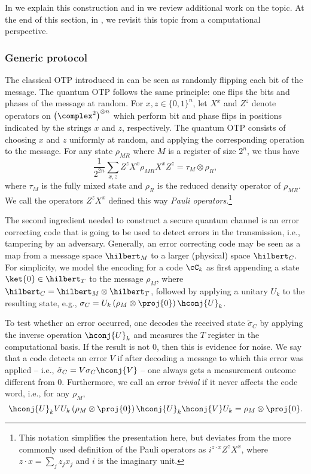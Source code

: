 In  we explain this construction and in
 we review additional work on the topic. At
the end of this section, in , we 
revisit this topic from a computational perspective.

\subsubsection{Generic protocol}
\label{sec:qmt.protocol}

The classical OTP introduced in  can be seen as
randomly flipping each bit of the message. The quantum OTP
\cite{AMTW00,BR03} follows the same principle: one flips the bits and
phases of the message at random. For $x,z \in \{0,1\}^n$, let $X^x$
and $Z^z$ denote operators on $\left(\complex^2\right)^{\otimes n}$
which perform bit and phase flips in positions indicated by the
strings $x$ and $z$, respectively. The quantum OTP consists of
choosing $x$ and $z$ uniformly at random, and applying the
corresponding operation to the message. For any state $\rho_{MR}$
where $M$ is a register of size $2^n$, we thus have
\[ 
\frac{1}{2^{2n}}\sum_{x,z} Z^z X^x \rho_{MR} X^x Z^z = \tau_M
\otimes \rho_R,
\]
where $\tau_M$ is the fully mixed state and $\rho_R$ is the reduced
density operator of $\rho_{MR}$. We call the operators $Z^zX^x$
defined this way \emph{Pauli operators}.\footnote{This notation
  simplifies the presentation here, but deviates from the more
  commonly used definition of the Pauli operators as
  $i^{z \cdot x} Z^z X^x$, where $z \cdot x = \sum_j z_jx_j$ and $i$
  is the imaginary unit.}

The second ingredient needed to construct a secure quantum channel is
an error correcting code that is going to be used to detect errors in
the transmission, i.e., tampering by an adversary. Generally, an error
correcting code may be seen as a map from a message space $\hilbert_M$
to a larger (physical) space $\hilbert_C$. For simplicity, we model
the encoding for a code $\cC_k$ as first appending a state
$\ket{0} \in \hilbert_T$ to the message $\rho_M$, where
$\hilbert_C = \hilbert_M \otimes \hilbert_T$, followed by applying a
unitary $U_k$ to the resulting state, e.g.,
$\sigma_{C} = U_k \left( \rho_M \otimes \proj{0} \right)
\hconj{U}_k$.

To test whether an error occurred, one decodes the received state
$\tilde{\sigma}_{C}$ by applying the inverse operation $\hconj{U}_k$
and measures the $T$ register in the computational basis. If the
result is not $0$, then this is evidence for noise. We say that a code
detects an error $V$ if after decoding a message to which this error
was applied \--- i.e., $\tilde{\sigma}_{C} = V \sigma_{C} \hconj{V}$
\--- one always gets a measurement outcome different from
$0$. Furthermore, we call an error \emph{trivial} if it never affects
the code word, i.e., for any $\rho_M$,
\[ 
  \hconj{U}_k V U_k \left( \rho_M \otimes \proj{0} \right)
\hconj{U}_k \hconj{V} U_k = \rho_M \otimes \proj{0}.
\]

